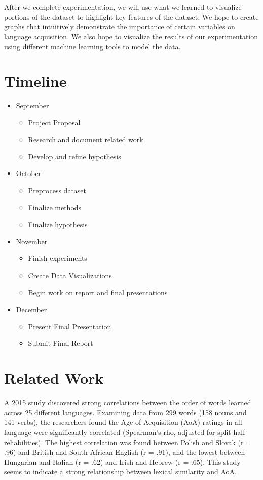 \documentclass[11pt]{article}
\begin{document}
After we complete experimentation, we will use what we learned to visualize portions of the dataset to highlight key features of the dataset.  We hope to create graphs that intuitively demonstrate the importance of certain variables on language acquisition.  We also hope to visualize the results of our experimentation using different machine learning tools to model the data.   

\section{Timeline}

\begin{itemize}
	\item September
		\begin{itemize}
			\item Project Proposal
			\item Research and document related work
			\item Develop and refine hypothesis
		\end{itemize}
	\item October
		\begin{itemize}
			\item Preprocess dataset
			\item Finalize methods
			\item Finalize hypothesis
		\end{itemize}
	\item November
		\begin{itemize}
			\item Finish experiments
			\item Create Data Visualizations
			\item Begin work on report and final presentations
		\end{itemize}
	\item December
		\begin{itemize}
			\item Present Final Presentation
			\item Submit Final Report
		\end{itemize}
\end{itemize}
		
\section{Related Work}

A 2015 study discovered strong correlations between the order of words learned across 25 different languages. Examining data from 299 words (158 nouns and 141 verbs), the researchers found the Age of Acquisition (AoA) ratings in all language were significantly correlated (Spearman's rho, adjusted for split-half reliabilities)\cite{haman}. The highest correlation was found between Polish and Slovak (r = .96) and British and South African English (r = .91), and the lowest between Hungarian and Italian (r = .62) and Irish and Hebrew (r = .65). This study seems to indicate a strong relationship between lexical similarity and AoA.
\end{document}
